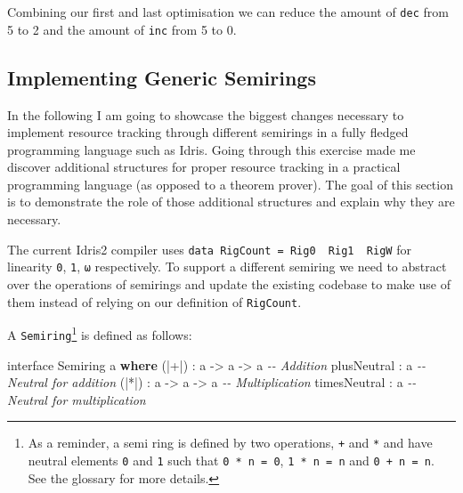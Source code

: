 \documentclass[
]{article}
\newenvironment{Shaded}{}{}
\newcommand{\CommentTok}[1]{\textcolor[rgb]{0.38,0.63,0.69}{\textit{#1}}}
\newcommand{\DataTypeTok}[1]{\textcolor[rgb]{0.56,0.13,0.00}{#1}}
\newcommand{\KeywordTok}[1]{\textcolor[rgb]{0.00,0.44,0.13}{\textbf{#1}}}
\newcommand{\NormalTok}[1]{#1}
\newcommand{\OperatorTok}[1]{\textcolor[rgb]{0.40,0.40,0.40}{#1}}
\newcommand{\OtherTok}[1]{\textcolor[rgb]{0.00,0.44,0.13}{#1}}
\begin{document}
Combining our first and last optimisation we can reduce the amount of
\texttt{dec} from 5 to 2 and the amount of \texttt{inc} from 5 to 0.

\hypertarget{implementing-generic-semirings}{%
\subsection{Implementing Generic
Semirings}\label{implementing-generic-semirings}}

In the following I am going to showcase the biggest changes necessary to
implement resource tracking through different semirings in a fully
fledged programming language such as Idris. Going through this exercise
made me discover additional structures for proper resource tracking in a
practical programming language (as opposed to a theorem prover). The
goal of this section is to demonstrate the role of those additional
structures and explain why they are necessary.

The current Idris2 compiler uses
\texttt{data\ RigCount\ =\ Rig0\ \textbar{}\ Rig1\ \textbar{}\ RigW} for
linearity \texttt{0}, \texttt{1}, \texttt{ω} respectively. To support a
different semiring we need to abstract over the operations of semirings
and update the existing codebase to make use of them instead of relying
on our definition of \texttt{RigCount}.

A \texttt{Semiring}\footnote{As a reminder, a semi ring is defined by
  two operations, \texttt{+} and \texttt{*} and have neutral elements
  \texttt{0} and \texttt{1} such that \texttt{0\ *\ n\ =\ 0},
  \texttt{1\ *\ n\ =\ n} and \texttt{0\ +\ n\ =\ n}. See the glossary
  for more details.} is defined as follows:

\begin{Shaded}
\begin{Highlighting}[]
\NormalTok{interface }\DataTypeTok{Semiring}\NormalTok{ a }\KeywordTok{where}
\NormalTok{  (}\OperatorTok{|+|}\NormalTok{) }\OperatorTok{:}\NormalTok{ a }\OtherTok{{-}\textgreater{}}\NormalTok{ a }\OtherTok{{-}\textgreater{}}\NormalTok{ a }\CommentTok{{-}{-} Addition}
\NormalTok{  plusNeutral }\OperatorTok{:}\NormalTok{ a     }\CommentTok{{-}{-} Neutral for addition}
\NormalTok{  (}\OperatorTok{|*|}\NormalTok{) }\OperatorTok{:}\NormalTok{ a }\OtherTok{{-}\textgreater{}}\NormalTok{ a }\OtherTok{{-}\textgreater{}}\NormalTok{ a }\CommentTok{{-}{-} Multiplication}
\NormalTok{  timesNeutral }\OperatorTok{:}\NormalTok{ a    }\CommentTok{{-}{-} Neutral for multiplication}
\end{Highlighting}
\end{Shaded}
\end{document}

